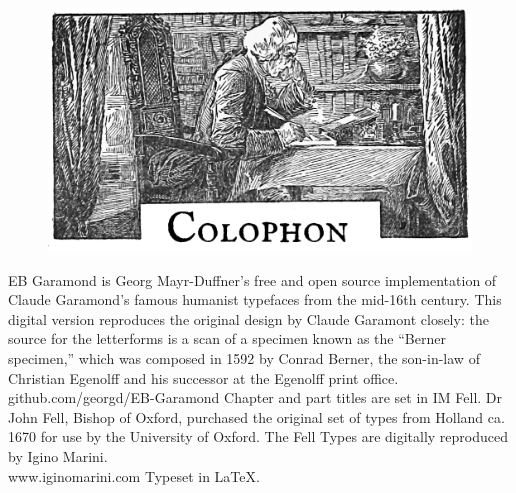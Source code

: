 \documentclass[
paper=a5,
BCOR=7mm,
twoside,
DIV=calc,
11pt,
usegeometry,
chapterprefix,
headings=big]{scrbook} %
\begin{document}











\clearpage

\chapter*{}
\begin{figure}[t!]
\centering
\includegraphics[width=\linewidth]{colophon}
\end{figure}
\centering
EB Garamond is Georg Mayr-Duffner's free and open source implementation of Claude Garamond’s famous humanist typefaces from the mid-16th century. This digital version reproduces the original design by Claude Garamont closely: the source for the letterforms is a scan of a specimen known as the \enquote{Berner specimen,} which was composed in 1592 by Conrad Berner, the son-in-law of Christian Egenolff and his successor at the Egenolff print office.  \\github.com/georgd/EB-Garamond
\vfill
Chapter and part titles are set in IM Fell. Dr John Fell, Bishop of Oxford, purchased the original set of types from Holland ca. 1670 for use by the University of Oxford. The Fell Types are digitally reproduced by Igino Marini. \\www.iginomarini.com
\vfill
Typeset in \LaTeX{}.
\thispagestyle{empty}
\end{document}
